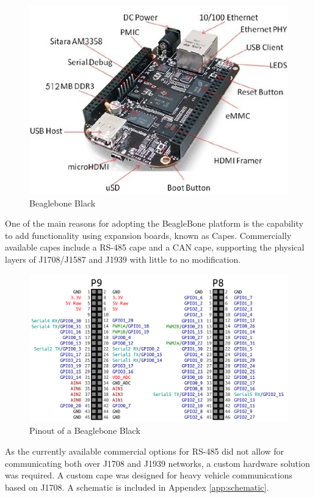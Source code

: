 \begin{figure}[h]
  \centering
  \includegraphics{BeagleBoneBlack}
  \caption{Beaglebone Black}
  \label{fig:BBB}
\end{figure}


One of the main reasons for adopting the BeagleBone platform is the capability to add functionality using expansion boards, known
as Capes. Commercially available capes include a RS-485 cape and a CAN cape, supporting the physical layers of J1708/J1587 and J1939
with little to no modification.


\begin{figure}[h]
  \centering
  \includegraphics{BeaglebonePinout}
  \caption{Pinout of a Beaglebone Black}
  \label{fig:BBB-pinout}
\end{figure}


As the currently available commercial options for RS-485 did not allow for communicating both over J1708 and J1939 networks, a custom
hardware solution was required. A custom cape was designed for heavy vehicle communications based on J1708\cite{J1708}. A schematic is included in 
Appendex \ref{app:schematic}.

